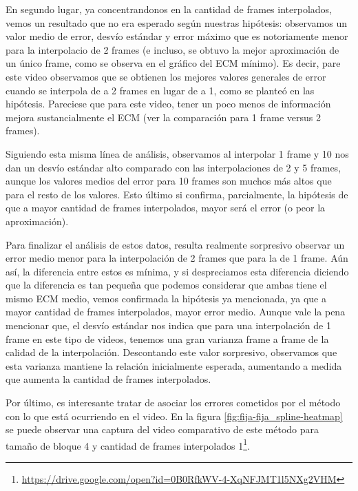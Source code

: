 \par En segundo lugar, ya concentrandonos en la cantidad de frames interpolados,
vemos un resultado que no era esperado seg\'un nuestras hip\'otesis: observamos
un valor medio de error, desv\'io est\'andar y error m\'aximo que es notoriamente
menor para la interpolacio de 2 frames (e incluso, se obtuvo la mejor
aproximaci\'on de un \'unico frame, como se observa en el gr\'afico del ECM
m\'inimo). Es decir, pare este video observamos que se obtienen los mejores
valores generales de error cuando se interpola de a 2 frames en lugar de a 1,
como se plante\'o en las hip\'otesis. Pareciese que para este video, tener un
poco menos de informaci\'on mejora sustancialmente el ECM (ver la comparaci\'on
para 1 frame versus 2 frames).

\par Siguiendo esta misma l\'inea de an\'alisis, observamos al interpolar 1 frame
y 10 nos dan un desv\'io est\'andar alto comparado con las interpolaciones de 2
y 5 frames, aunque los valores medios del error para 10 frames son muchos m\'as
altos que para el resto de los valores. Esto \'ultimo si confirma, parcialmente,
la hip\'otesis de que a mayor cantidad de frames interpolados, mayor ser\'a el
error (o peor la aproximaci\'on).

\par Para finalizar el an\'alisis de estos datos, resulta realmente sorpresivo
observar un error medio menor para la interpolaci\'on de 2 frames que para la
de 1 frame. A\'un as\'i, la diferencia entre estos es m\'inima, y si
despreciamos esta diferencia diciendo que la diferencia es tan peque\~na que
podemos considerar que ambas tiene el mismo ECM medio, vemos confirmada la
hip\'otesis ya mencionada, ya que a mayor cantidad de frames interpolados,
mayor error medio. Aunque vale la pena mencionar que, el desv\'io est\'andar
nos indica que para una interpolaci\'on de 1 frame en este tipo de videos,
tenemos una gran varianza frame a frame de la calidad de la interpolaci\'on.
Descontando este valor sorpresivo, observamos que esta varianza mantiene la
relaci\'on inicialmente esperada, aumentando a medida que aumenta la cantidad
de frames interpolados.

\par Por \'ultimo, es interesante tratar de asociar los errores cometidos por
el m\'etodo con lo que est\'a ocurriendo en el video. En la figura
\ref{fig:fija-fija_spline-heatmap} se puede observar una captura del video
comparativo de este m\'etodo para tama\~no de bloque 4 y cantidad de frames
interpolados 1\footnote{\url{https://drive.google.com/open?id=0B0RfkWV-4-XqNFJMT1l5NXg2VHM}}.

